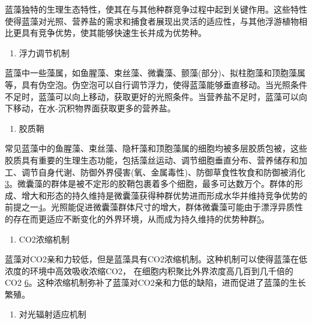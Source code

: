 \documentclass[
]{book}
\providecommand{\tightlist}{%
  \setlength{\itemsep}{0pt}\setlength{\parskip}{0pt}}
\begin{document}
蓝藻独特的生理生态特性，使其在与其他种群竞争过程中起到关键作用。这些特性使得蓝藻对光照、营养盐的需求和捕食者展现出灵活的适应性，与其他浮游植物相比更具有竞争优势，使其能够快速生长并成为优势种。

\begin{enumerate}
\def\labelenumi{\arabic{enumi}.}
\tightlist
\item
  浮力调节机制
\end{enumerate}

蓝藻中一些藻属，如鱼腥藻、束丝藻、微囊藻、颤藻(部分)、拟柱胞藻和顶胞藻属等，具有伪空泡。伪空泡可以自行调节浮力，使得蓝藻能够垂直移动。当光照条件不足时，蓝藻可以向上移动，获取更好的光照条件。当营养盐不足时，蓝藻可以向下移动，在水-沉积物界面获取更多的营养盐。

\begin{enumerate}
\def\labelenumi{\arabic{enumi}.}
\setcounter{enumi}{1}
\tightlist
\item
  胶质鞘
\end{enumerate}

常见蓝藻中的鱼腥藻、束丝藻、隐杆藻和顶胞藻属的细胞均被多层胶质包被，这些胶质具有重要的生理生态功能，包括藻丝运动、调节细胞垂直分布、营养储存和加工、调节自身代谢、防御外界侵害(氧、金属毒性)、防御草食性牧食和防御被消化\href{Puga\%20A\%20P,\%20Abreu\%20C\%20A,\%20et\%20al.\%20J.\%20of\%20Environ.\%20Manage.,\%202015,\%20159:\%2086–93.}{3}。微囊藻的群体是被不定形的胶鞘包裹着多个细胞，最多可达数万个。群体的形成、增大和形态的持久维持是微囊藻获得种群优势进而形成水华并维持竞争优势的前提之一\href{Khan\%20S,\%20Cai\%20Chao,\%20et\%20al．\%20Environ.\%20Sci.\%20\&\%20Technol.,\%202013,\%2047\%20:\%208624-8632．}{4}。光照能促进微囊藻群体尺寸的增大，群体微囊藻可能由于漂浮异质性的存在而更适应不断变化的外界环境，从而成为持久维持的优势种群\href{Bi\%20H,\%20Huang\%20X,\%20et\%20al.\%20Small\%202014,\%2010,\%203544.}{5}。

\begin{enumerate}
\def\labelenumi{\arabic{enumi}.}
\setcounter{enumi}{2}
\tightlist
\item
  CO2浓缩机制
\end{enumerate}

蓝藻对CO2亲和力较低，但是蓝藻具有CO2浓缩机制。这种机制可以使得蓝藻在低浓度的环境中高效吸收浓缩CO2， 在细胞内积聚比外界浓度高几百到几千倍的 CO2 \href{Gupta\%20V\%20K,\%20Ganjali\%20M\%20R,\%20et\%20al.\%20Chemical\%20Engineering\%20Journal,\%202012,\%20197:\%20330.}{6}。这种浓缩机制弥补了蓝藻对CO2亲和力低的缺陷，进而促进了蓝藻的生长繁殖。

\begin{enumerate}
\def\labelenumi{\arabic{enumi}.}
\setcounter{enumi}{3}
\tightlist
\item
  对光辐射适应机制
\end{enumerate}
\end{document}
